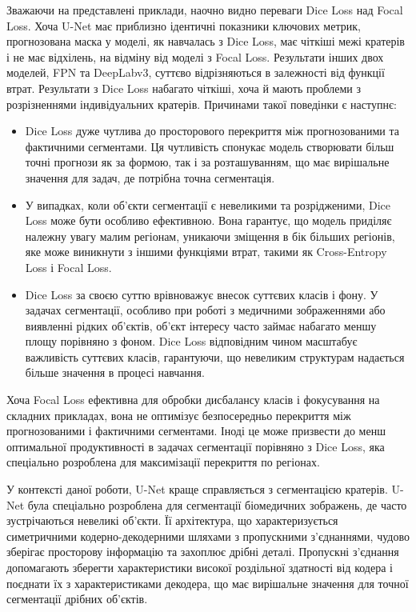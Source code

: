 Зважаючи на представлені приклади, наочно видно переваги Dice Loss
над Focal Loss. Хоча U-Net має приблизно ідентичні показники
ключових метрик, прогнозована маска у моделі, як навчалась з Dice Loss,
має чіткіші межі кратерів і не має відхілень, на відміну від моделі
з Focal Loss. Результати інших двох моделей, FPN та DeepLabv3,
суттєво відрізняються в залежності від функції втрат. Результати
з Dice Loss набагато чіткіші, хоча й мають проблеми з
розрізненнями індивідуальних кратерів. Причинами такої поведінки
є наступнє:

\begin{itemize}

      \item Dice Loss дуже чутлива до просторового перекриття між прогнозованими та
            фактичними сегментами. Ця чутливість спонукає модель створювати більш точні
            прогнози як за формою, так і за розташуванням, що має вирішальне значення для
            задач, де потрібна точна сегментація.
      \item У випадках, коли об'єкти сегментації є
            невеликими та розрідженими, Dice Loss може
            бути особливо ефективною. Вона гарантує,
            що модель приділяє належну увагу малим регіонам,
            уникаючи зміщення в бік більших регіонів, яке може
            виникнути з іншими функціями втрат, такими як Cross-Entropy Loss і Focal Loss.
      \item Dice Loss за своєю суттю врівноважує внесок суттєвих класів і фону. У задачах
            сегментації, особливо при роботі з медичними зображеннями або виявленні рідких
            об'єктів, об'єкт інтересу часто займає набагато меншу площу порівняно з фоном.
            Dice Loss відповідним чином масштабує важливість суттєвих класів, гарантуючи,
            що невеликим структурам надається більше значення в процесі навчання.

\end{itemize}

Хоча Focal Loss ефективна для обробки дисбалансу
класів і фокусування на складних прикладах, вона
не оптимізує безпосередньо перекриття між прогнозованими
і фактичними сегментами. Іноді це може призвести до менш
оптимальної продуктивності в задачах сегментації порівняно
з Dice Loss, яка спеціально розроблена для максимізації перекриття
по регіонах.

У контексті даної роботи, U-Net краще справляється з
сегментацією кратерів. U-Net була спеціально розроблена
для сегментації біомедичних зображень, де часто зустрічаються
невеликі об'єкти. Її архітектура, що характеризується симетричними
кодерно-декодерними шляхами з пропускними з'єднаннями,
чудово зберігає просторову інформацію та захоплює дрібні деталі.
Пропускні з'єднання допомагають зберегти характеристики
високої роздільної здатності від кодера і поєднати їх з
характеристиками декодера, що має вирішальне значення для
точної сегментації дрібних об'єктів.

